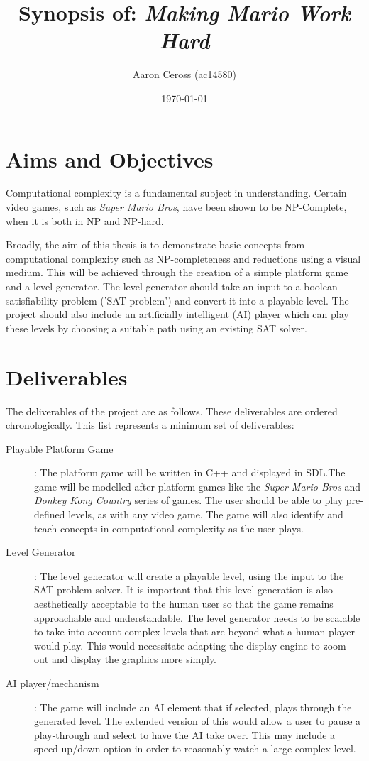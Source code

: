 \documentclass[a4paper]{article}
\title{Synopsis of: \textit{Making Mario Work Hard}}
\author{Aaron Ceross (ac14580)}
\date{\today}
\begin{document}
\maketitle

\section{Aims and Objectives}

Computational complexity is a fundamental subject in understanding. Certain video games, such as \textit{Super Mario Bros}, have been shown to be NP-Complete, when it is both in NP and NP-hard.\par  
\noindent Broadly, the aim of this thesis is to demonstrate basic concepts from computational complexity such as NP-completeness and reductions using a visual medium. This will be achieved through the creation of a simple platform game and a level generator. The level generator should take an input to a boolean satisfiability problem ('SAT problem') and convert it into a playable level. The project should also include an artificially intelligent (AI) player which can play these levels by choosing a suitable path using an existing SAT solver.

\section{Deliverables}

The deliverables of the project are as follows. These deliverables are ordered chronologically. This list represents a minimum set of deliverables:

\begin{description}
\item[Playable Platform Game]: The platform game will be written in C++ and displayed in SDL.\@ The game will be modelled after platform games like the \textit{Super Mario Bros} and \textit{Donkey Kong Country} series of games. The user should be able to play pre-defined levels, as with any video game. The game will also identify and teach concepts in computational complexity as the user plays.
\item[Level Generator]: The level generator will create a playable level, using the input to the SAT problem solver. It is important that this level generation is also aesthetically acceptable to the human user so that the game remains approachable and understandable. The level generator needs to be scalable to take into account complex levels that are beyond what a human player would play. This would necessitate adapting the display engine to zoom out and display the graphics more simply. 
\item[AI player/mechanism]: The game will include an AI element that if selected, plays through the generated level. The extended version of this would allow a user to pause a play-through and select to have the AI take over. This may include a speed-up/down option in order to reasonably watch a large complex level. 
\end{description}
\end{document}
